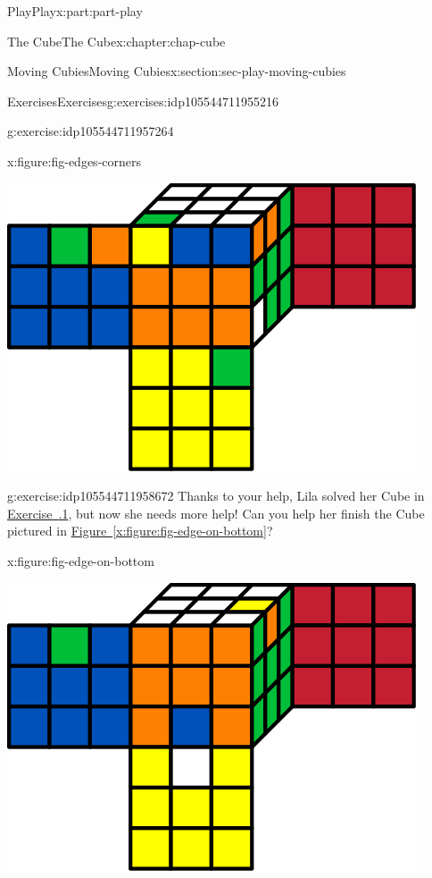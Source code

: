 \documentclass[oneside,10pt,]{book}
\newcommand{\xreffont}{\relax}
\numberwithin{equation}{section}
\begin{document}
\begin{partptx}{Play}{}{Play}{}{}{x:part:part-play}
\begin{chapterptx}{The Cube}{}{The Cube}{}{}{x:chapter:chap-cube}
\begin{sectionptx}{Moving Cubies}{}{Moving Cubies}{}{}{x:section:sec-play-moving-cubies}
\begin{exercises-subsection-numberless}{Exercises}{}{Exercises}{}{}{g:exercises:idp105544711955216}
\begin{divisionexercise}{2}{}{}{g:exercise:idp105544711957264}
\begin{figureptx}{}{x:figure:fig-edges-corners}{}
\begin{image}{0.25}{0.5}{0.25}
\includegraphics[width=\linewidth]{./images/edges-corners.svg}
\end{image}%
\tcblower
\end{figureptx}%
\end{divisionexercise}%
\begin{divisionexercise}{3}{}{}{g:exercise:idp105544711958672}%
Thanks to your help, Lila solved her Cube in \hyperlink{x:exercise:exer-scrambled-edges}{Exercise~{\xreffont 1.3.1}}, but now she needs more help! Can you help her finish the Cube pictured in \hyperref[x:figure:fig-edge-on-bottom]{Figure~{\xreffont\ref{x:figure:fig-edge-on-bottom}}}?%
\begin{figureptx}{}{x:figure:fig-edge-on-bottom}{}%
\begin{image}{0.25}{0.5}{0.25}%
\includegraphics[width=\linewidth]{./images/edge_on_bottom.svg}

\end{image}
\end{figureptx}
\end{divisionexercise}
\end{exercises-subsection-numberless}
\end{sectionptx}
\end{chapterptx}
\end{partptx}
\end{document}
